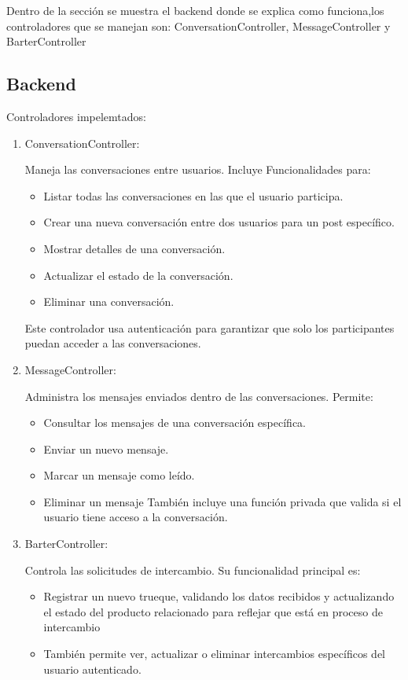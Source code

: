 \documentclass[11pt, a4paper, oneside]{book}
\begin{document}
Dentro de la sección se muestra el backend donde se explica como funciona,los controladores que  se manejan son: ConversationController, MessageController y BarterController 

\subsection{Backend}
Controladores impelemtados:

\begin{enumerate}
    \item ConversationController:
    

Maneja las conversaciones entre usuarios. Incluye Funcionalidades para:

\begin{itemize}
    \item Listar todas las conversaciones en las que el usuario participa.
    \item Crear una nueva conversación entre dos usuarios para un post específico.
    \item Mostrar detalles de una conversación.
    \item Actualizar el estado de la conversación.
    \item Eliminar una conversación.
\end{itemize}
Este controlador usa autenticación para garantizar que solo los participantes puedan acceder a las conversaciones.


    \item MessageController:
   
    Administra los mensajes enviados dentro de las conversaciones.
    Permite:
     \begin{itemize}
         \item Consultar los mensajes de una conversación específica.
         \item Enviar un nuevo mensaje.
         \item Marcar un mensaje como leído.
         \item Eliminar un mensaje
        También incluye una función privada que valida si el usuario tiene acceso a la conversación.
     \end{itemize}

    \item BarterController:
    
   Controla las solicitudes de intercambio. Su funcionalidad principal es:

   \begin{itemize}
   \item  Registrar un nuevo trueque, validando los datos recibidos y actualizando el estado del producto relacionado para reflejar que está en proceso de intercambio
   \item También permite ver, actualizar o eliminar intercambios específicos del usuario autenticado.
   \end{itemize}
       
   \end{enumerate}
\end{document}
